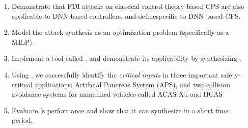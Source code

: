 \begin{enumerate}
	\item Demonstrate that FDI attacks on classical control-theory based CPS are also applicable to DNN-based controllers, and define\attack specific to DNN based CPS. %
	\item Model the attack synthesis as an optimization problem (specifically as a MILP). %
	
	\item Implement a tool called \tool, and demonstrate its applicability by synthesizing \attack.%
	\item Using \tool, we successfully identify the \textit{critical inputs} in three important safety-critical applications: Artificial Pancreas System (APS),  and  two collision avoidance systems for unmanned vehicles called ACAS-Xu and HCAS
	\item Evaluate \tool's performance and show that it can synthesize \attack in a short time period.   %
\end{enumerate}


